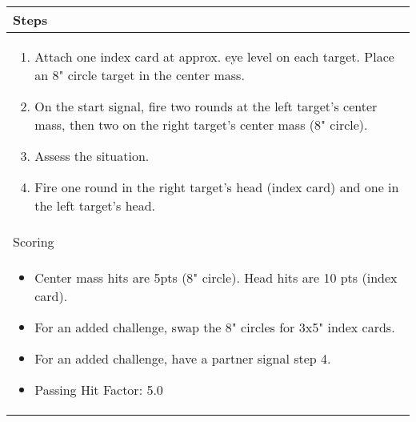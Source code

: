 \documentclass[../Cover.tex]{subfiles}
\begin{document}
	\begin{tabular}{ | p{} |}
		\hline
		\rowcolor[HTML]{C0C0C0}Steps\\ 
		\hline
		\tiny \begin{enumerate}[topsep=0pt, partopsep=0pt]
			\item Attach one index card at approx. eye level on each target. Place an 8" circle target in the center mass.
			\item On the start signal, fire two rounds at the left target's center mass, then two on the right target's center mass (8" circle).
			\item Assess the situation.
			\item Fire one round in the right target's head (index card) and one in the left target's head.
		\end{enumerate}		
		\\ [0.25\textheight]
		\hline
		\rowcolor[HTML]{C0C0C0}Scoring \\
		\hline
		\tiny \begin{itemize}[topsep=0pt, partopsep=0pt]
			\item Center mass hits are 5pts (8" circle). Head hits are 10 pts (index card).
			\item For an added challenge, swap the 8" circles for 3x5" index cards.
			\item For an added challenge, have a partner signal step 4.
			\item Passing Hit Factor: 5.0 
		\end{itemize}		
		\\ [0.2\textheight]
		\hline
	\end{tabular}
\end{document}
